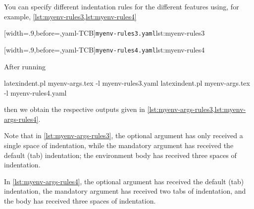  \begin{example}
 You can specify different indentation rules for the different features using, for
 example, \cref{lst:myenv-rules3,lst:myenv-rules4}

 \begin{minipage}{.49\textwidth}
  [width=.9\linewidth,before=\centering,yaml-TCB]{\texttt{myenv-rules3.yaml}}{lst:myenv-rules3}
 \end{minipage}
 \hfill
 \begin{minipage}{.49\textwidth}
  [width=.9\linewidth,before=\centering,yaml-TCB]{\texttt{myenv-rules4.yaml}}{lst:myenv-rules4}
 \end{minipage}

 After running 

 \begin{commandshell}
latexindent.pl myenv-args.tex -l myenv-rules3.yaml  
latexindent.pl myenv-args.tex -l myenv-rules4.yaml  
\end{commandshell}

 then we obtain the respective outputs given in
 \cref{lst:myenv-args-rules3,lst:myenv-args-rules4}.

 \begin{widepage}
  \begin{minipage}{.5\textwidth}
  \end{minipage}%
  \hfill
  \begin{minipage}{.5\textwidth}
  \end{minipage}
 \end{widepage}

 Note that in \cref{lst:myenv-args-rules3}, the optional argument has only received a
 single space of indentation, while the mandatory argument has received the default (tab)
 indentation; the environment body has received three spaces of indentation.

 In \cref{lst:myenv-args-rules4}, the optional argument has received the default (tab)
 indentation, the mandatory argument has received two tabs of indentation, and the body
 has received three spaces of indentation.
 \end{example}

